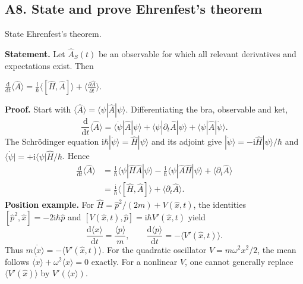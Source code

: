 \documentclass[11pt,a4paper]{article}
\newcommand{\key}[1]{\begin{resultbox}\centering\(\displaystyle #1\)\end{resultbox}}
\newcommand{\dd}{\mathrm{d}}\newcommand{\iu}{\mathrm{i}}\newcommand{\ee}{\mathrm{e}}
\newcommand{\avg}[1]{\langle #1\rangle}\newcommand{\Sch}{Schr\"odinger}
\newcommand{\bra}[1]{\langle #1|}\newcommand{\ket}[1]{|#1\rangle}
\begin{document}
\subsection{A8. State and prove Ehrenfest's theorem}
\begin{questionbox}
State Ehrenfest's theorem.
\end{questionbox}
\textbf{Statement.} Let \(\hat A_S(t)\) be an observable for which all relevant derivatives and expectations exist. Then
\key{\boxed{\frac{\dd}{\dd t}\avg{\hat A}=\frac{\iu}{\hbar}\avg{[\hat H,\hat A]}+\avg{\frac{\partial\hat A}{\partial t}}.}}
\textbf{Proof.} Start with \(\avg{\hat A}=\bra\psi\hat A\ket\psi\). Differentiating the bra, observable and ket,
\begin{equation}\frac{\dd}{\dd t}\avg{\hat A}=\bra{\dot\psi}\hat A\ket\psi+\bra\psi\partial_t\hat A\ket\psi+\bra\psi\hat A\ket{\dot\psi}.\end{equation}
The Schr\"odinger equation \(\iu\hbar\ket{\dot\psi}=\hat H\ket\psi\) and its adjoint give
\(\ket{\dot\psi}=-\iu\hat H\ket\psi/\hbar\) and \(\bra{\dot\psi}=+\iu\bra\psi\hat H/\hbar\). Hence
\begin{align}
\frac{\dd}{\dd t}\avg{\hat A}
&=\frac{\iu}{\hbar}\bra\psi\hat H\hat A\ket\psi-\frac{\iu}{\hbar}\bra\psi\hat A\hat H\ket\psi+\avg{\partial_t\hat A}\\
&=\frac{\iu}{\hbar}\avg{[\hat H,\hat A]}+\avg{\partial_t\hat A}.
\end{align}
\textbf{Position example.} For \(\hat H=\hat p^2/(2m)+V(\hat x,t)\), the identities \([\hat p^2,\hat x]=-2\iu\hbar\hat p\) and \([V(\hat x,t),\hat p]=\iu\hbar V'(\hat x,t)\) yield
\begin{equation}
\boxed{\frac{\dd\avg{x}}{\dd t}=\frac{\avg p}{m},\qquad\frac{\dd\avg p}{\dd t}=-\avg{V'(\hat x,t)}.}
\end{equation}
Thus \(m\ddot{\avg x}=-\avg{V'(\hat x,t)}\). For the quadratic oscillator \(V=m\omega^2x^2/2\), the mean follows \(\ddot{\avg x}+\omega^2\avg x=0\) exactly. For a nonlinear \(V\), one cannot generally replace \(\avg{V'(\hat x)}\) by \(V'(\avg x)\).
\end{document}
